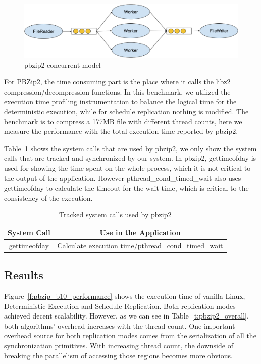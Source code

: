 \begin{figure}
\centering
\includegraphics[width=0.8\columnwidth]{figures/pbzip2_model}
\caption{pbzip2 concurrent model}
\label{f:pbzip_model}
\end{figure}

For PBZip2, the time consuming part is the place where it calls the libz2 compression/decompression functions. In this benchmark, we utilized the execution time profiling instrumentation to balance the logical time for the deterministic execution, while for schedule replication nothing is modified. The benchmark is to compress a 177MB file with different thread counts, here we measure the performance with the total execution time reported by pbzip2.

Table~\ref{t:pbzip2_syscall} shows the system calls that are used by pbzip2, we only show the system calls that are tracked and synchronized by our system. In pbzip2,  gettimeofday is used for showing the time spent on the whole process, which it is not critical to the output of the application. However pthread\_cond\_timed\_wait also uses gettimeofday to calculate the timeout for the wait time, which is critical to the consistency of the execution.

\begin{table}
 \caption{Tracked system calls used by pbzip2}
\begin{center}
 \begin{tabular}{c | c}
 System Call & Use in the Application\\ \hline
 gettimeofday & Calculate execution time/pthread\_cond\_timed\_wait
 \end{tabular}
\end{center}
\label{t:pbzip2_syscall}
\end{table}

\subsection{Results}

Figure~\ref{f:pbzip_b10_performance} shows the execution time of vanilla Linux, Deterministic Execution and Schedule Replication. Both replication modes achieved decent scalability. However, as we can see in Table~\ref{t:pbzip2_overall}, both algorithms' overhead increases with the thread count. One important overhead source for both replication modes comes from the serialization of all the synchronization primitives. With increasing thread count, the downside of breaking the parallelism of accessing those regions becomes more obvious.

